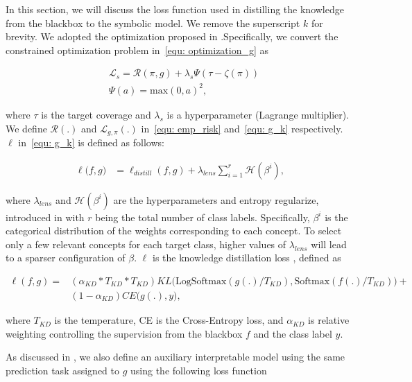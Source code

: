 In this section, we will discuss the loss function used in distilling the knowledge from the blackbox to the symbolic model. We remove the superscript $k$ for brevity. We adopted the optimization proposed in \cite{geifman2019selectivenet}.Specifically, we convert the constrained optimization problem in~\cref{equ: optimization_g} as 

\begin{align}
\label{equ:unconstrained_risk}
&\mathcal{L}_s = \mathcal{R}(\pi, g) + \lambda_s \Psi(\tau - \zeta(\pi))\\ \nonumber
&\Psi(a) = \text{max}(0, a)^2 ,
\end{align}

where $\tau$ is the target coverage and $\lambda_s$ is a hyperparameter (Lagrange multiplier). We define $\mathcal{R}(.)$ and $\mathcal{L}_{g, \pi}(.)$ in~\cref{equ: emp_risk} and~\cref{equ: g_k} respectively. $\ell$ in~\cref{equ: g_k} is defined as follows:

\begin{align}
\label{equ:ell}
\ell\big(f, g \big) &= \ell_{distill}(f, g) + \lambda_{lens}\sum_{i=1}^r\mathcal{H}(\beta^i) ,
\end{align}

where $\lambda_{lens}$ and $\mathcal{H}(\beta^i)$ are the hyperparameters and entropy regularize, introduced in \cite{barbiero2022entropy} with $r$ being the total number of class labels. Specifically, $\beta^i$ is the categorical distribution of the weights corresponding to each concept.  To select only a few relevant concepts for each target class, higher values of $\lambda_{lens}$ will lead to a sparser configuration of $\beta$. $\ell$ is the knowledge distillation loss \cite{hinton2015distilling}, defined as 

\begin{align}
\label{equ:distill}
\ell(f, g) = & (\alpha_{KD}* T_{KD}*T_{KD}) KL\big(\text{LogSoftmax}(g(.)/T_{KD}) , \text{Softmax}(f(.)/T_{KD})\big) + \\ \nonumber
& (1 - \alpha_{KD}) CE\big(g(.), y\big),
\end{align}

where $T_{KD}$ is the temperature, CE is the Cross-Entropy loss, and $\alpha_{KD}$ is relative weighting controlling the supervision from the blackbox $f$ and the class label $y$.

As discussed in \cite{geifman2019selectivenet}, we also define an auxiliary interpretable model using the same prediction task assigned to $g$ using the following loss function


